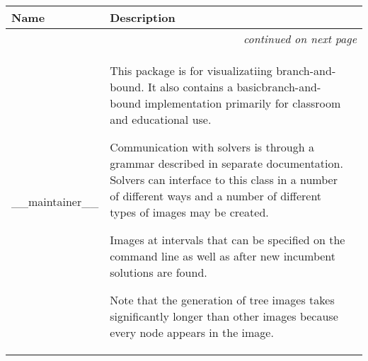     \vspace{-1cm}
\hspace{\varindent}\begin{longtable}{|p{\varnamewidth}|p{\vardescrwidth}|l}
\cline{1-2}
\cline{1-2} \centering \textbf{Name} & \centering \textbf{Description}& \\
\cline{1-2}
\endhead\cline{1-2}\multicolumn{3}{r}{\small\textit{continued on next page}}\\\endfoot\cline{1-2}
\endlastfoot\raggedright \_\-\_\-m\-a\-i\-n\-t\-a\-i\-n\-e\-r\-\_\-\_\- & \raggedright This package is for visualizatiing branch-and-bound. It also 
          contains a basicbranch-and-bound implementation primarily for 
          classroom and educational use.

          Communication with solvers is through a grammar described in 
          separate documentation. Solvers can interface to this class in a 
          number of different ways and a number of different types of 
          images may be created.

          Images at intervals that can be specified on the command line as 
          well as after new incumbent solutions are found.

          Note that the generation of tree images takes significantly 
          longer than other images because every node appears in the image.


\end{longtable}
